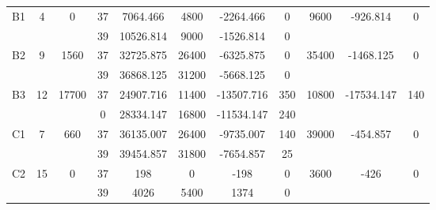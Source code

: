 \begin{sidewaystable}
\begin{tabular}{c||c|c||c|c|c|c|c||c|c|c}
         &
        
      \\
      \hline
      \multirow{2}{*}{B1} &
      \multirow{2}{*}{4} &
      \multirow{2}{*}{0} &
      37 &
      7064.466 &
      4800 &
        -2264.466 &
        0 &
      \multirow{2}{*}{9600} &
        \multirow{2}{*}{-926.814} &
        \multirow{2}{*}{0}
      \\
      \cline{4-8}
       &
       &
       &
      39 &
      10526.814 &
      9000 &
        -1526.814 &
        0 &
      
         &
        
      \\
      \hline
      \multirow{2}{*}{B2} &
      \multirow{2}{*}{9} &
      \multirow{2}{*}{1560} &
      37 &
      32725.875 &
      26400 &
        -6325.875 &
        0 &
      \multirow{2}{*}{35400} &
        \multirow{2}{*}{-1468.125} &
        \multirow{2}{*}{0}
      \\
      \cline{4-8}
       &
       &
       &
      39 &
      36868.125 &
      31200 &
        -5668.125 &
        0 &
      
         &
        
      \\
      \hline
      \multirow{2}{*}{B3} &
      \multirow{2}{*}{12} &
      \multirow{2}{*}{17700} &
      37 &
      24907.716 &
      11400 &
        -13507.716 &
        350 &
      \multirow{2}{*}{10800} &
        \multirow{2}{*}{-17534.147} &
        \multirow{2}{*}{140}
      \\
      \cline{4-8}
       &
       &
       &
      0 &
      28334.147 &
      16800 &
        -11534.147 &
        240 &
      
         &
        
      \\
      \hline
      \multirow{2}{*}{C1} &
      \multirow{2}{*}{7} &
      \multirow{2}{*}{660} &
      37 &
      36135.007 &
      26400 &
        -9735.007 &
        140 &
      \multirow{2}{*}{39000} &
        \multirow{2}{*}{-454.857} &
        \multirow{2}{*}{0}
      \\
      \cline{4-8}
       &
       &
       &
      39 &
      39454.857 &
      31800 &
        -7654.857 &
        25 &
      
         &
        
      \\
      \hline
      \multirow{2}{*}{C2} &
      \multirow{2}{*}{15} &
      \multirow{2}{*}{0} &
      37 &
      198 &
      0 &
        -198 &
        0 &
      \multirow{2}{*}{3600} &
        \multirow{2}{*}{-426} &
        \multirow{2}{*}{0}
      \\
      \cline{4-8}
       &
       &
       &
      39 &
      4026 &
      5400 &
        1374 &
        0 &
      

\end{tabular}
\end{sidewaystable}
